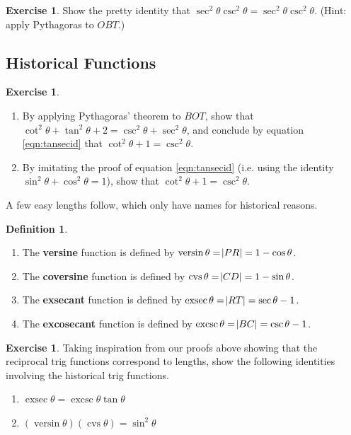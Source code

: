 \documentclass[a4paper,leqno]{article}
\numberwithin{equation}{section}
\theoremstyle{definition}
\newtheorem{defn}[equation]{Definition}
\newtheorem{exercise}[equation]{Exercise}
\theoremstyle{remark}
\newcommand{\df}[1]{\textbf{#1}}
\DeclareMathOperator{\versin}{versin}
\DeclareMathOperator{\cvs}{cvs}
\DeclareMathOperator{\exsec}{exsec}
\DeclareMathOperator{\excsc}{excsc}
\begin{document}
\begin{exercise}
  Show the pretty identity that $ \sec^2 \theta \csc^2 \theta = \sec^2 \theta \csc^2 \theta $. (Hint: apply Pythagoras to $ OBT $.)
\end{exercise}

\subsection{Historical Functions}
\begin{exercise}\leavevmode
  \begin{enumerate}
    \item By applying Pythagoras' theorem to $ BOT $, show that $ \cot^2 \theta + \tan^2 \theta + 2 = \csc^2 \theta + \sec^2 \theta $,
          and conclude by equation \ref{eqn:tansecid} that $ \cot^2 \theta + 1 = \csc^2 \theta $.
    \item By imitating the proof of equation \ref{eqn:tansecid} (i.e. using the identity $ \sin^2 \theta + \cos^2 \theta = 1 $), show
          that $ \cot^2 \theta + 1 = \csc^2 \theta $.
  \end{enumerate}
\end{exercise}

A few easy lengths follow, which only have names for historical reasons.
\begin{defn}\leavevmode
  \begin{enumerate}
    \item The \df{versine} function is defined by $ \versin \theta = \abs{PR} = 1 - \cos \theta $.
    \item The \df{coversine} function is defined by $ \cvs \theta = \abs{CD} = 1 - \sin \theta $.
    \item The \df{exsecant} function is defined by $ \exsec \theta = \abs{RT} = \sec \theta - 1 $.
    \item The \df{excosecant} function is defined by $ \excsc \theta = \abs{BC} = \csc \theta - 1$.
  \end{enumerate}
\end{defn}

\begin{exercise}
  Taking inspiration from our proofs above showing that the reciprocal trig functions correspond
  to lengths, show the following identities involving the historical trig functions.
  \begin{enumerate}
    \item $ \exsec \theta = \excsc \theta \tan \theta $
    \item $ (\versin \theta)(\cvs \theta) = \sin^2 \theta $
  \end{enumerate}
\end{exercise}
\end{document}

